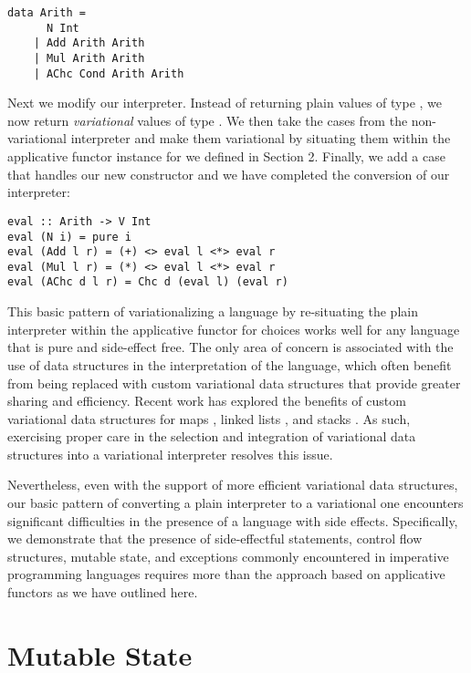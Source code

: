 \documentclass[12pt,oneside]{book}
\begin{document}
\begin{lstlisting}
data Arith =
      N Int
    | Add Arith Arith
    | Mul Arith Arith
    | AChc Cond Arith Arith
\end{lstlisting}

Next we modify our interpreter. Instead of returning plain values of type ,
we now return \emph{variational} values of type . We then take the cases
from the non-variational interpreter and make them variational by situating them within the
applicative functor instance for  we defined in Section 2. Finally, we add a case
that handles our new  constructor and we have completed the conversion of our
interpreter:

\begin{lstlisting}
eval :: Arith -> V Int
eval (N i) = pure i
eval (Add l r) = (+) <> eval l <*> eval r
eval (Mul l r) = (*) <> eval l <*> eval r
eval (AChc d l r) = Chc d (eval l) (eval r)
\end{lstlisting}

This basic pattern of variationalizing a language by re-situating the
plain interpreter within the applicative functor for choices works well for any language that is pure
and side-effect free. The only area of concern is associated with the use of data structures in the
interpretation of the language, which often benefit from being replaced with custom variational data structures that
provide greater sharing and efficiency. Recent work has explored the benefits of custom variational
data structures for maps \cite{walkingshaw2014variational}, linked lists \cite{lists}, and stacks \cite{stacks}.
As such, exercising proper care in the selection and integration of variational data structures
into a variational interpreter resolves this issue.

Nevertheless, even with the support of more efficient
variational data structures, our basic pattern of converting a plain interpreter to a variational one
encounters significant difficulties in the presence of a language with side effects. Specifically, we
demonstrate that the presence of side-effectful statements, control flow structures, mutable state, and exceptions
commonly encountered in imperative programming languages requires more than the approach based
on applicative functors as we have outlined here.

\section{Mutable State}
\label{sec:mutst}
\end{document}
